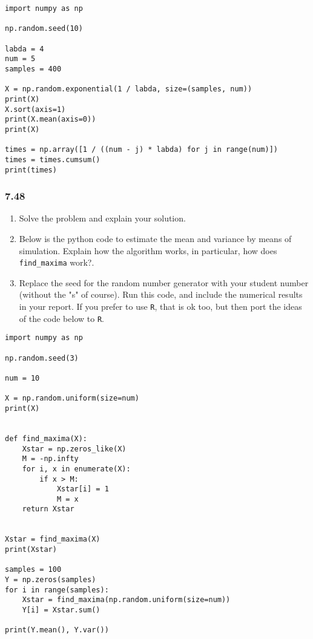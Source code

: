 \documentclass[a4paper]{article}
\begin{document}
\begin{verbatim}
import numpy as np

np.random.seed(10)

labda = 4
num = 5
samples = 400

X = np.random.exponential(1 / labda, size=(samples, num))
print(X)
X.sort(axis=1)
print(X.mean(axis=0))
print(X)

times = np.array([1 / ((num - j) * labda) for j in range(num)])
times = times.cumsum()
print(times)
\end{verbatim}




\subsubsection{7.48}
\label{sec:org56d10c5}
\begin{enumerate}
\item Solve  the problem and explain your solution.
\item Below is the python code to estimate the mean and variance by means of simulation.   Explain how the algorithm works, in particular, how does \texttt{find\_maxima} work?.
\item Replace the seed for the random number generator with your student number (without the "s" of course). Run this code, and include the numerical results in your report. If you prefer to use \texttt{R}, that is ok too, but then port the ideas of the code below to \texttt{R}.
\end{enumerate}

\begin{verbatim}
import numpy as np

np.random.seed(3)

num = 10

X = np.random.uniform(size=num)
print(X)


def find_maxima(X):
    Xstar = np.zeros_like(X)
    M = -np.infty
    for i, x in enumerate(X):
        if x > M:
            Xstar[i] = 1
            M = x
    return Xstar


Xstar = find_maxima(X)
print(Xstar)

samples = 100
Y = np.zeros(samples)
for i in range(samples):
    Xstar = find_maxima(np.random.uniform(size=num))
    Y[i] = Xstar.sum()

print(Y.mean(), Y.var())
\end{verbatim}
\end{document}
